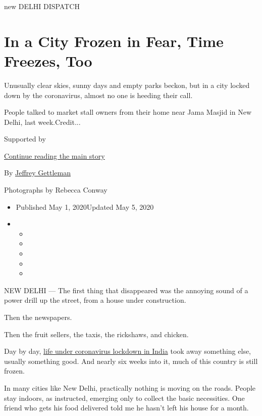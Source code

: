 new DELHI DISPATCH

\hypertarget{in-a-city-frozen-in-fear-time-freezes-too}{%
\section{In a City Frozen in Fear, Time Freezes,
Too}\label{in-a-city-frozen-in-fear-time-freezes-too}}

Unusually clear skies, sunny days and empty parks beckon, but in a city
locked down by the coronavirus, almost no one is heeding their call.

People talked to market stall owners from their home near Jama Masjid in
New Delhi, last week.Credit...

Supported by

\protect\hyperlink{after-sponsor}{Continue reading the main story}

By \href{https://www.nytimes.com/by/jeffrey-gettleman}{Jeffrey
Gettleman}

Photographs by Rebecca Conway

\begin{itemize}
\item
  Published May 1, 2020Updated May 5, 2020
\item
  \begin{itemize}
  \item
  \item
  \item
  \item
  \item
  \end{itemize}
\end{itemize}

NEW DELHI --- The first thing that disappeared was the annoying sound of
a power drill up the street, from a house under construction.

Then the newspapers.

Then the fruit sellers, the taxis, the rickshaws, and chicken.

Day by day,
\href{https://www.nytimes.com/2020/03/25/world/asia/india-lockdown-coronavirus.html}{life
under coronavirus lockdown in India} took away something else, usually
something good. And nearly six weeks into it, much of this country is
still frozen.

In many cities like New Delhi, practically nothing is moving on the
roads. People stay indoors, as instructed, emerging only to collect the
basic necessities. One friend who gets his food delivered told me he
hasn't left his house for a month.

